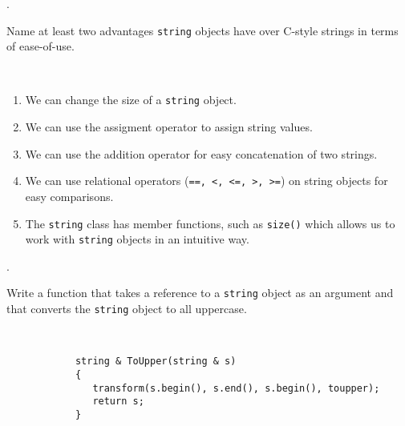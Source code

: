\documentclass{amsart}
\begin{document}
\phantom{\quad}\vfill
{}. 
\begin{minipage}[t]{11.5 cm}
	Name at least two advantages \texttt{string} objects have over C-style strings in terms of ease-of-use.
\end{minipage} \\[1ex]
\phantom{2. } 
\begin{minipage}[t]{11.5 cm}
	{\slshape 
		\begin{enumerate}
			\item
				We can change the size of a \verb+string+ object.
			\item
				We can use the assigment operator to assign string values.
			\item
				We can use the addition operator for easy concatenation 
				of two strings.
			\item 
				We can use relational operators (\verb+==, <, <=, >, >=+)
				on string objects for easy comparisons.
			\item
				The \verb+string+ class has member functions, such as 
				\verb+size()+ which allows us to work with \verb+string+
				objects in an intuitive way.
		\end{enumerate}
	} 
\end{minipage} 
\vfill

. 
\begin{minipage}[t]{11.5 cm}
	Write a function that takes a reference to a \texttt{string} object as an argument and that converts the \texttt{string} object to all uppercase.
\end{minipage} \\[1ex]
\phantom{3. } 
\begin{minipage}[t]{11.5 cm}
	{\slshape 
		\begin{verbatim}
			string & ToUpper(string & s)
			{
			   transform(s.begin(), s.end(), s.begin(), toupper);
			   return s;
			}
		\end{verbatim}
	} 
\end{minipage} 
\vfill
\end{document}
